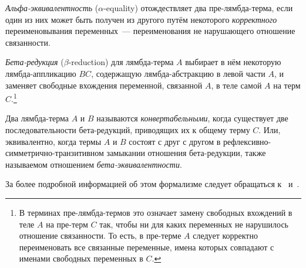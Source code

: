 \emph{Альфа-эквивалентность} ($\alpha$-equality) отождествляет два пре-лямбда-терма, если один из них может быть получен из другого путём некоторого \emph{корректного} переименовывания переменных~— переименования не нарушающего отношение связанности.

\emph{Бета-редукция} ($\beta$-reduction) для лямбда-терма $A$ выбирает в нём некоторую лямбда-аппликацию $B C$, содержащую лямбда-абстракцию в левой части $A$, и заменяет свободные вхождения переменной, связанной $A$, в теле самой $A$ на терм $C$.\footnote{В терминах пре-лямбда-термов это означает замену свободных вхождений в теле $A$ на пре-терм $C$ так, чтобы ни для каких переменных не нарушилось отношение связанности. То есть, в пре-терме $A$ следует корректно переименовать все связанные переменные, имена которых совпадают с именами свободных переменных в $C$.}

Два лямбда-терма $A$ и $B$ называются \emph{конвертабельными},
когда существует две последовательности бета-редукций, приводящих их к общему терму $C$.
Или, эквивалентно, когда термы $A$ и $B$ состоят с друг с другом в рефлексивно-симметрично-транзитивном замыкании отношения бета-редукции, также называемом отношением \emph{бета-эквивалентности}.

За более подробной информацией об этом формализме следует обращаться к~\cite{TTFP} и~\cite{Sorensen}.

